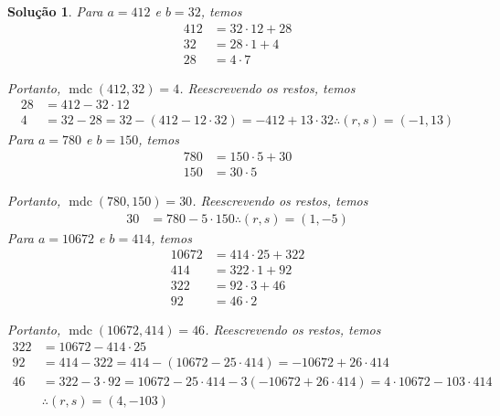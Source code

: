 \documentclass[a4paper,12pt]{article}
\DeclareMathOperator{\mdc}{mdc}
\newtheorem*{solution}{Solução}
\begin{document}
	\begin{solution}
		Para $a = 412$ e $b= 32$, temos
		\begin{align*}
		412 &= 32\cdot 12 + 28 \\
		32 &= 28\cdot 1 + 4 \\
		28 &= 4\cdot 7 
		\end{align*}
		\par Portanto, $\mdc(412, 32) = 4$. Reescrevendo os restos, temos
		\begin{align*}
		28 &= 412 - 32\cdot 12 \\
		4 &= 32 - 28 = 32 - (412 - 12\cdot 32) = -412 + 13\cdot 32 \therefore (r,s) = (-1,13)
		\end{align*}
		Para $a = 780$ e $b= 150$, temos
		\begin{align*}
		780 &= 150\cdot 5 + 30 \\
		150 &= 30\cdot 5 
		\end{align*}
		\par Portanto, $\mdc(780, 150) = 30$. Reescrevendo os restos, temos
		\begin{align*}
		30 &= 780 - 5\cdot 150 \therefore (r,s) = (1,-5)
		\end{align*}
		Para $a = 10672$ e $b= 414$, temos
		\begin{align*}
		10672 &= 414\cdot 25 + 322 \\
		414 &= 322\cdot 1 + 92 \\
		322 &= 92\cdot 3 + 46 \\
		92 &= 46\cdot 2 
		\end{align*}
		\par Portanto, $\mdc(10672, 414) = 46$. Reescrevendo os restos, temos
		\begin{align*}
		322 &= 10672 - 414\cdot 25 \\
		92 &= 414 - 322 = 414 - (10672 - 25\cdot 414) = -10672 + 26\cdot 414 \\
		46 &= 322 - 3\cdot 92 = 10672 - 25\cdot 414 - 3( -10672 + 26\cdot 414 ) = 4\cdot 10672 - 103\cdot 414 
		\\ &\therefore (r,s) = (4,-103)
		\end{align*}
		
		
		
	\end{solution}

	
\end{document}
